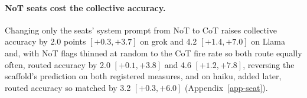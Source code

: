 \paragraph{NoT seats cost the collective accuracy.}
Changing only the seats' system prompt from NoT to CoT raises
collective accuracy by 2.0 points $[+0.3, +3.7]$ on grok and
4.2 $[+1.4, +7.0]$ on Llama and, with NoT flags thinned at random to
the CoT fire rate so both route equally often, routed
accuracy by 2.0 $[+0.1, +3.8]$ and 4.6 $[+1.2, +7.8]$, reversing the
scaffold's prediction on both registered measures, and on haiku, added
later, routed accuracy so matched by 3.2 $[+0.3, +6.0]$ (Appendix~\ref{app-seat}).
